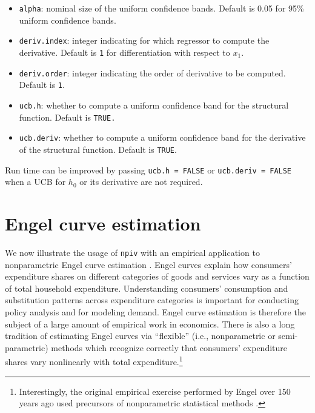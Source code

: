 \documentclass[
]{jss}
\begin{document}
\begin{itemize}
\item
  \texttt{alpha}: nominal size of the uniform confidence bands. Default
  is 0.05 for 95\% uniform confidence bands.
\item
  \texttt{deriv.index}: integer indicating for which regressor to
  compute the derivative. Default is \texttt{1} for differentiation with
  respect to \(x_1\).
\item
  \texttt{deriv.order}: integer indicating the order of derivative to be
  computed. Default is \texttt{1}.
\item
  \texttt{ucb.h}: whether to compute a uniform confidence band for the
  structural function. Default is \texttt{TRUE.}
\item
  \texttt{ucb.deriv}: whether to compute a uniform confidence band for
  the derivative of the structural function. Default is \texttt{TRUE}.
\end{itemize}

Run time can be improved by passing \texttt{ucb.h\ =\ FALSE} or
\texttt{ucb.deriv\ =\ FALSE} when a UCB for \(h_0\) or its derivative
are not required.

\section{Engel curve estimation}\label{engel}

We now illustrate the usage of \texttt{npiv} with an empirical
application to nonparametric Engel curve estimation \citep{BCK}. Engel
curves explain how consumers' expenditure shares on different categories
of goods and services vary as a function of total household expenditure.
Understanding consumers' consumption and substitution patterns across
expenditure categories is important for conducting policy analysis and
for modeling demand. Engel curve estimation is therefore the subject of
a large amount of empirical work in economics. There is also a long
tradition of estimating Engel curves via ``flexible'' (i.e.,
nonparametric or semi-parametric) methods which recognize correctly that
consumers' expenditure shares vary nonlinearly with total
expenditure.\footnote{Interestingly, the original empirical exercise
  performed by Engel over 150 years ago used precursors of nonparametric
  statistical methods \citep{CM}.}
\end{document}
